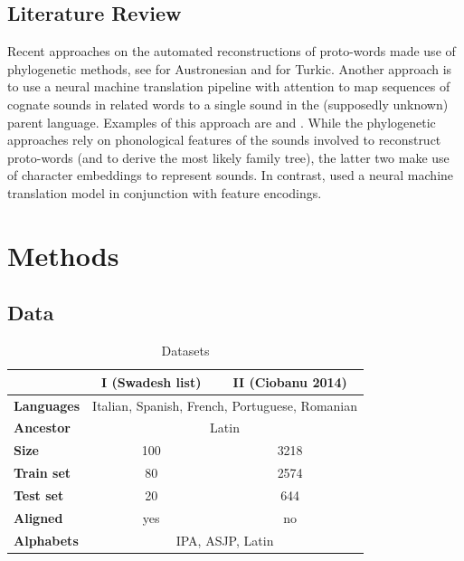 \newpage
\newpage

\subsection{Literature Review}
Recent approaches on the automated reconstructions of proto-words made use of phylogenetic methods, see \cite{bouchard-Cote_et_al:2013} for Austronesian
and \cite{hruschka_detecting_2015} for Turkic. Another approach is to use a neural machine translation pipeline with attention to map sequences of cognate sounds
in related words to a single sound in the (supposedly unknown) parent language. Examples of this approach are \cite{ciobanu-dinu-2018-ab} and \cite{meloni2019ab}.
While the phylogenetic approaches rely on phonological features of the sounds involved to reconstruct proto-words (and to derive the most likely family tree), 
the latter two make use of character embeddings to represent sounds. In contrast, \cite{dekker_msc_2018} used a neural machine translation model in conjunction with feature encodings. 

\section{Methods}
\subsection{Data}
\begin{table}
\centering
\begin{tabular}{lcc}
    \hline
    & \textbf{I} (Swadesh list) & \textbf{II} (Ciobanu 2014) \\
    \hline
    \textbf{Languages} & \multicolumn{2}{c}{Italian, Spanish, French, Portuguese, Romanian} \\
    \textbf{Ancestor} & \multicolumn{2}{c}{Latin} \\
    \textbf{Size} & 100 & 3218 \\
    \textbf{Train set} & 80 & 2574 \\
    \textbf{Test set} & 20 & 644 \\
    \textbf{Aligned} & yes & no \\
    \textbf{Alphabets} & \multicolumn{2}{c}{IPA, ASJP, Latin} \\
    \hline
\end{tabular}
\caption{Datasets}
\label{tab:datasets}
\end{table}

